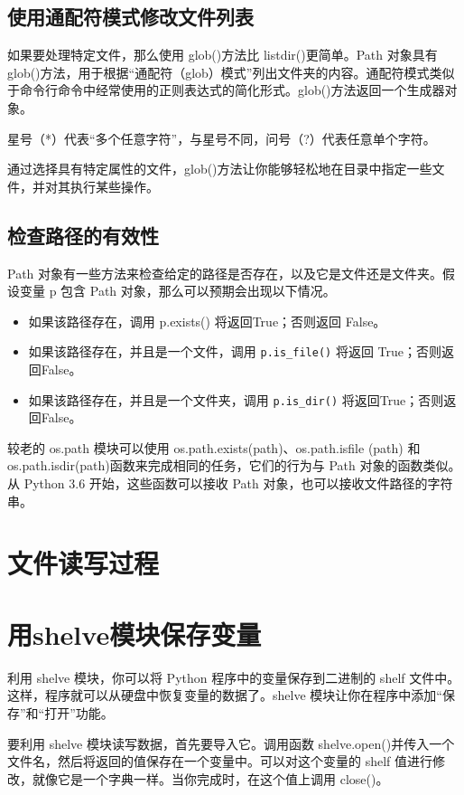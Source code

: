 \subsection{使用通配符模式修改文件列表}
如果要处理特定文件，那么使用 glob()方法比 listdir()更简单。Path 对象具有 glob()方法，用于根据“通配符（glob）模式”列出文件夹的内容。通配符模式类似于命令行命令中经常使用的正则表达式的简化形式。glob()方法返回一个生成器对象。

星号（*）代表“多个任意字符”，与星号不同，问号（?）代表任意单个字符。

通过选择具有特定属性的文件，glob()方法让你能够轻松地在目录中指定一些文件，并对其执行某些操作。
\subsection{检查路径的有效性}
Path 对象有一些方法来检查给定的路径是否存在，以及它是文件还是文件夹。假设变量 p 包含 Path 对象，那么可以预期会出现以下情况。

\begin{itemize}
    \item 如果该路径存在，调用 p.exists() 将返回True；否则返回 False。
    \item 如果该路径存在，并且是一个文件，调用 \verb|p.is_file()| 将返回 True；否则返回False。
    \item 如果该路径存在，并且是一个文件夹，调用 \verb|p.is_dir()| 将返回True；否则返回False。
\end{itemize}

较老的 os.path 模块可以使用 os.path.exists(path)、os.path.isfile (path) 和 os.path.isdir(path)函数来完成相同的任务，它们的行为与 Path 对象的函数类似。从 Python 3.6 开始，这些函数可以接收 Path 对象，也可以接收文件路径的字符串。
\section{文件读写过程}
\section{用shelve模块保存变量}
利用 shelve 模块，你可以将 Python 程序中的变量保存到二进制的 shelf 文件中。这样，程序就可以从硬盘中恢复变量的数据了。shelve 模块让你在程序中添加“保存”和“打开”功能。

要利用 shelve 模块读写数据，首先要导入它。调用函数 shelve.open()并传入一个文件名，然后将返回的值保存在一个变量中。可以对这个变量的 shelf 值进行修改，就像它是一个字典一样。当你完成时，在这个值上调用 close()。

